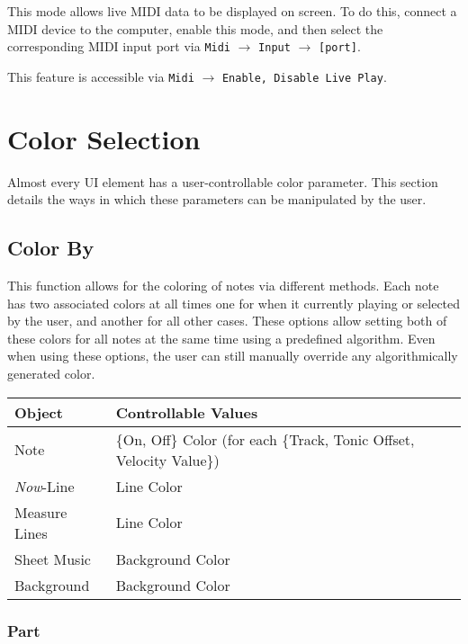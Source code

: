 \documentclass[english]{article}
\makeatletter
\newenvironment{restoretext}%
    {\@parboxrestore%
     \begin{adjustwidth}{}{\leftmargin}%
    }{\end{adjustwidth}
     }
\def\rcbegin{\begin{restoretext}\centering}
\def\rcend{\end{restoretext}}
\providecommand{\mi}[1]{\texttt{#1}}
\makeatother
\begin{document}
This mode allows live MIDI data to be displayed on screen. To do this, connect a MIDI device to the computer, enable
this mode, and then select the corresponding MIDI input port via 
\mi{Midi} $\rightarrow$ \mi{Input} $\rightarrow$ \mi{[port]}.

This feature is accessible via 
\mi{Midi} $\rightarrow$ \mi{{Enable, Disable} Live Play}.

\section{Color Selection}

Almost every UI element has a user-controllable color parameter. This section details the ways in which these
parameters can be manipulated by the user.

\subsection{Color By}

This function allows for the coloring of notes via different methods. Each note has two associated colors at all times
\textendash{} one for when it currently playing or selected by the user, and another for all other cases. These options allow
setting both of these colors for all notes at the same time using a predefined algorithm. Even when using these options,
the user can still manually override any algorithmically generated color.

\vspace{1em}

\rcbegin
\begin{tabular}{|l|l|}
  \hline
  \textbf{Object}           & \textbf{Controllable Values} \\
  \hline
  Note                    & \{On, Off\} Color (for each \{Track, Tonic Offset, Velocity Value\})\\
  \textit{Now}-Line       & Line Color \\
  Measure Lines           & Line Color \\
  Sheet Music             & Background Color \\
  Background              & Background Color \\
  \hline
\end{tabular}
\rcend

\vspace{1em}

\subsubsection{Part}
\end{document}
